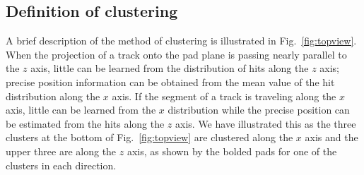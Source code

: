 \documentclass[review]{elsarticle}
\begin{document}
\subsection{Definition of clustering}
A brief description of the method of clustering is illustrated in Fig.~\ref{fig:topview}. When the projection of a track onto the pad plane is passing nearly parallel to the $z$ axis, little can be learned from the distribution of hits along the $z$ axis; precise position information can be obtained from the mean value of the hit distribution along the $x$ axis. If the segment of a track is traveling along the $x$ axis, little can be learned from the $x$ distribution while the precise position can be estimated from the hits along the $z$ axis. We have illustrated this as the three clusters at the bottom of Fig.~\ref{fig:topview} are clustered along the $x$ axis and the upper three are along the $z$ axis, as shown by the bolded pads for one of the clusters in each direction.
\end{document}
